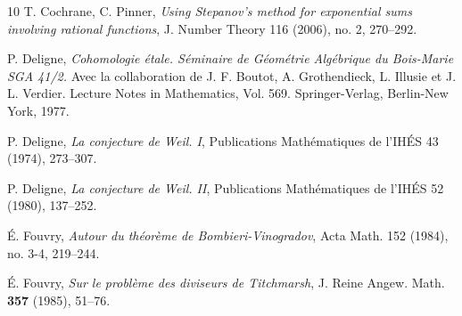 \documentclass[12pt,a4paper,reqno]{amsart}
\numberwithin{equation}{section}
\theoremstyle{plain}
\theoremstyle{definition}
\begin{document}
\begin{thebibliography}{10}
 T. Cochrane, C. Pinner, \emph{Using Stepanov's
    method for exponential sums involving rational functions},
  J. Number Theory 116 (2006), no. 2, 270--292.

 P. Deligne,  \emph{ Cohomologie \'etale.
    S\'eminaire de G\'eom\'etrie Alg\'ebrique du Bois-Marie SGA 41/2.}
  Avec la collaboration de J. F. Boutot, A. Grothendieck, L. Illusie
  et J.  L. Verdier. Lecture Notes in Mathematics,
  Vol. 569. Springer-Verlag, Berlin-New York, 1977.

P. Deligne, \emph{La conjecture de Weil. I}, Publications Math\'ematiques de l'IH\'ES 43 (1974), 273--307.

P. Deligne, \emph{La conjecture de Weil. II}, Publications Math\'ematiques de l'IH\'ES 52 (1980), 137--252.






 \'E. Fouvry, \emph{Autour du th\'eor\`eme de
    Bombieri-Vinogradov}, Acta Math. 152 (1984), no. 3-4,
  219--244.

\'E. Fouvry, \emph{Sur le probl\`eme des diviseurs de Titchmarsh}, J. Reine Angew. Math. \textbf{357} (1985), 51--76.



\end{thebibliography}
\end{document}
